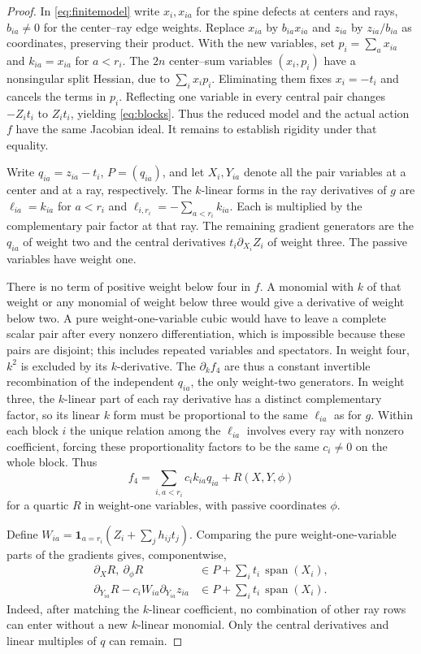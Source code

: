 \begin{proof}
In \eqref{eq:finitemodel} write \(x_i,x_{ia}\) for the spine defects at centers and rays, \(b_{ia}\ne0\) for the center--ray edge weights. Replace \(x_{ia}\) by \(b_{ia}x_{ia}\) and \(z_{ia}\) by \(z_{ia}/b_{ia}\) as coordinates, preserving their product. With the new variables, set \(p_i=\sum_a x_{ia}\) and \(k_{ia}=x_{ia}\) for \(a<r_i\). The \(2n\) center--sum variables \((x_i,p_i)\) have a nonsingular split Hessian, due to \(\sum_i x_i p_i\). Eliminating them fixes \(x_i=-t_i\) and cancels the terms in \(p_i\). Reflecting one variable in every central pair changes \(-Z_i t_i\) to \(Z_i t_i\), yielding \eqref{eq:blocks}. Thus the reduced model and the actual action \(f\) have the same Jacobian ideal. It remains to establish rigidity under that equality.

Write \(q_{ia}=z_{ia}-t_i\), \(P=(q_{ia})\), and let \(X_i,Y_{ia}\) denote all the pair variables at a center and at a ray, respectively. The \(k\)-linear forms in the ray derivatives of \(g\) are \(\ell_{ia}=k_{ia}\) for \(a<r_i\) and \(\ell_{i,r_i}=-\sum_{a<r_i}k_{ia}\). Each is multiplied by the complementary pair factor at that ray. The remaining gradient generators are the \(q_{ia}\) of weight two and the central derivatives \(t_i\partial_{X_i}Z_i\) of weight three. The passive variables have weight one.

There is no term of positive weight below four in \(f\). A monomial with \(k\) of that weight or any monomial of weight below three would give a derivative of weight below two. A pure weight-one-variable cubic would have to leave a complete scalar pair after every nonzero differentiation, which is impossible because these pairs are disjoint; this includes repeated variables and spectators. In weight four, \(k^2\) is excluded by its \(k\)-derivative. The \(\partial_k f_4\) are thus a constant invertible recombination of the independent \(q_{ia}\), the only weight-two generators. In weight three, the \(k\)-linear part of each ray derivative has a distinct complementary factor, so its linear \(k\) form must be proportional to the same \(\ell_{ia}\) as for \(g\). Within each block \(i\) the unique relation among the \(\ell_{ia}\) involves every ray with nonzero coefficient, forcing these proportionality factors to be the same \(c_i\ne0\) on the whole block. Thus
\[
       f_4=\sum_{i,a<r_i}c_i k_{ia}q_{ia}+R(X,Y,\phi)
\]
for a quartic \(R\) in weight-one variables, with passive coordinates \(\phi\).

Define \(W_{ia}=\mathbf 1_{a=r_i}(Z_i+\sum_j h_{ij}t_j)\). Comparing the pure weight-one-variable parts of the gradients gives, componentwise,
\begin{align}
 \partial_X R,\ \partial_\phi R
       &\in P+\sum_i t_i\,\operatorname{span}(X_i),\\
 \partial_{Y_{ia}}R-c_i W_{ia}\partial_{Y_{ia}}z_{ia}
       &\in P+\sum_i t_i\,\operatorname{span}(X_i).\label{eq:blockres}
\end{align}
Indeed, after matching the \(k\)-linear coefficient, no combination of other ray rows can enter without a new \(k\)-linear monomial. Only the central derivatives and linear multiples of \(q\) can remain.


\end{proof}
